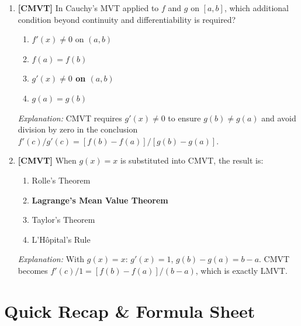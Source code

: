 \documentclass[12pt,a4paper]{article}
\begin{document}
\begin{enumerate}
  \item \textbf{[CMVT]} In Cauchy's MVT applied to $f$ and $g$ on $[a,b]$, which additional
        condition beyond continuity and differentiability is required?
        \begin{enumerate}[label=(\Alph*)]
          \item $f'(x) \neq 0$ on $(a,b)$
          \item $f(a) = f(b)$
          \item \textbf{$g'(x) \neq 0$ on $(a,b)$}
          \item $g(a) = g(b)$
        \end{enumerate}
        \textit{Explanation:} CMVT requires $g'(x)\neq 0$ to ensure $g(b)\neq g(a)$ and avoid
        division by zero in the conclusion $f'(c)/g'(c) = [f(b)-f(a)]/[g(b)-g(a)]$.

  \item \textbf{[CMVT]} When $g(x) = x$ is substituted into CMVT, the result is:
        \begin{enumerate}[label=(\Alph*)]
          \item Rolle's Theorem
          \item \textbf{Lagrange's Mean Value Theorem}
          \item Taylor's Theorem
          \item L'H\^{o}pital's Rule
        \end{enumerate}
        \textit{Explanation:} With $g(x)=x$: $g'(x)=1$, $g(b)-g(a)=b-a$. CMVT becomes
        $f'(c)/1=[f(b)-f(a)]/(b-a)$, which is exactly LMVT.
\end{enumerate}

\section{Quick Recap \& Formula Sheet}
\end{document}
